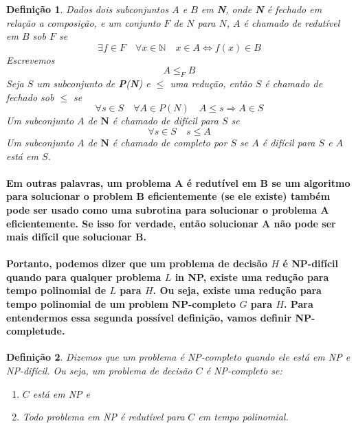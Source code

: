 \documentclass[a4paper,10pt]{article}
\theoremstyle{plain}
\newtheorem*{spn-def}{Definição}
\begin{document}
\begin{spn-def} Dados dois subconjuntos $A$ e $B$ em \textbf{N}, onde \textbf{N} é fechado em
  relação a composição, e um conjunto $F$ de $N$ para $N$, $A$ é chamado de redutível em $B$ sob
  $F$ se
  \begin{equation}
    \exists f \in F \quad \forall x \in \mathbb{N} \quad x \in A \iff f(x) \in B
  \end{equation}
  Escrevemos
  \begin{equation}
    A \leq_{F} B
  \end{equation}
  Seja $S$ um subconjunto de \textbf{P}(\textbf{N}) e $\leq$ uma redução, então $S$ é chamado de
  \textit{fechado} sob $\leq$ se
  \begin{equation}
    \forall s \in S \quad \forall A \in P(N) \quad A \leq s \Rightarrow A \in S
  \end{equation}
  Um subconjunto $A$ de $\mathbf{N}$ é chamado de \textit{difícil} para $S$ se
  \begin{equation}
    \forall s \in S \quad s \leq A
  \end{equation}
  Um subconjunto $A$ de $\mathbf{N}$ é chamado de \textit{completo} por $S$ se $A$ é difícil para
  $S$ e $A$ está em $S$.
\end{spn-def}

\paragraph{
  Em outras palavras, um problema A é redutível em B se um algoritmo para solucionar o problem B
  eficientemente (se ele existe) também pode ser usado como uma subrotina para solucionar o
  problema A eficientemente. Se isso for verdade, então solucionar A não pode ser mais difícil que
  solucionar B.
}

\paragraph{
  Portanto, podemos dizer que um problema de decisão $H$ é NP-difícil quando para qualquer problema
  $L$ in NP, existe uma redução para tempo polinomial de $L$ para $H$. Ou seja, existe uma redução
  para tempo polinomial de um problem NP-completo $G$ para $H$. Para entendermos essa segunda
  possível definição, vamos definir NP-completude.
}

\begin{spn-def} Dizemos que um problema é NP-completo quando ele está em NP e NP-difícil. Ou
  seja, um problema de decisão $C$ é NP-completo se:
  \begin{enumerate}
    \item $C$ está em NP e
    \item Todo problema em NP é redutível para $C$ em tempo polinomial.
  \end{enumerate}
\end{spn-def}
\end{document}
